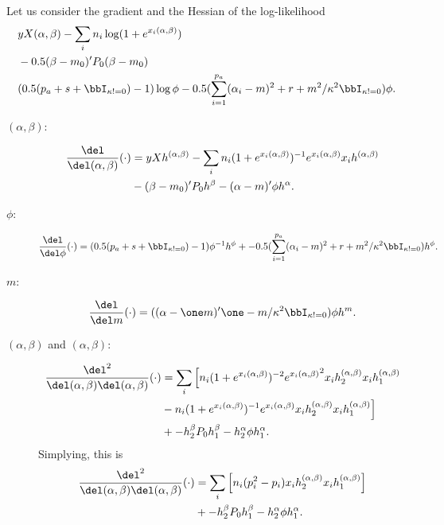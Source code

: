 \documentclass[draft]{article}
\newcommand{\graddel}[1]{\frac{\del}{\del #1}}
\newcommand{\hessdel}[2]{\frac{\del^2}{\del #1 \del #2}}
\begin{document}
Let us consider the gradient and the Hessian of the log-likelihood
\begin{align*}
& y X (\alpha, \beta) - \sum_i n_i \log (1 + e^{x_i (\alpha, \beta)}) \\
& - 0.5 (\beta - m_0)' P_0 (\beta - m_0) \\
& (0.5 (p_a + s + \bbI_{\kappa != 0}) - 1) \log \phi - 0.5 (\sum_{i=1}^{p_a}
(\alpha_i - m)^2 + r + m^2 / \kappa^2 \bbI_{\kappa != 0}) \phi.
\end{align*}
\begin{description}

\item[$(\alpha, \beta)$:]
\begin{align*}
\frac{\del}{\del (\alpha, \beta)} (\cdot) 
& = y X h^{(\alpha, \beta)} 
  - \sum_i n_i (1 + e^{x_i(\alpha, \beta)})^{-1} e^{x_i (\alpha, \beta)} x_i h^{(\alpha, \beta)} \\
& - (\beta - m_0)' P_0 h^{\beta}
  - (\alpha -  m)' \phi h^{\alpha}.
\end{align*}

\item[$\phi$:]
\begin{align*}
\graddel{\phi} (\cdot) = (0.5 (p_a + s + \bbI_{\kappa != 0}) - 1) \phi^{-1}
h^{\phi}
+ - 0.5 (\sum_{i=1}^{p_a}
(\alpha_i - m)^2 + r + m^2 / \kappa^2 \bbI_{\kappa != 0}) h^{\phi}.
\end{align*}

\item[$m$:]
\begin{align*}
\graddel{m} (\cdot) = ( (\alpha - \one m)' \one - m / \kappa^2
\bbI_{\kappa != 0}) \phi h^{m}.
\end{align*}

\item[$(\alpha, \beta)$ and $(\alpha, \beta)$:]
\begin{align*}
\hessdel{(\alpha,\beta)}{(\alpha,\beta)} (\cdot)
& = \sum_i \Big[ n_i (1 + e^{x_i(\alpha, \beta)})^{-2} {e^{x_i (\alpha,
    \beta)}}^2 x_i h^{(\alpha,\beta)}_2 x_i h^{(\alpha,\beta)}_1 \\
& - n_i (1 + e^{x_i(\alpha, \beta)})^{-1} e^{x_i (\alpha, \beta)} x_i
  h^{(\alpha,\beta)}_2 x_i h^{(\alpha,\beta)}_1 \Big] \\
& + - h^{\beta}_2 P_0 h^{\beta}_1 - h^{\alpha}_2 \phi h^{\alpha}_1.
\end{align*}
Simplying, this is
\begin{align*}
\hessdel{(\alpha,\beta)}{(\alpha,\beta)} (\cdot)
& = \sum_i \Big[ n_i (p_i^2 - p_i) x_i
  h^{(\alpha,\beta)}_2 x_i h^{(\alpha,\beta)}_1 \Big] \\
& + - h^{\beta}_2 P_0 h^{\beta}_1 - h^{\alpha}_2 \phi h^{\alpha}_1.
\end{align*}


\end{description}
\end{document}
